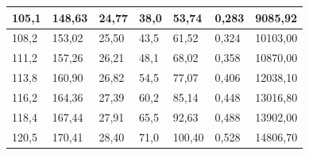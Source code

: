 \documentclass[a4paper,12pt]{article} %
\begin{document}
\begin{table}[h!]
\begin{tabular}{|l|l|l|l|l|l|l|}
		105,1                                     & 148,63                                                  & 24,77                                                 & 38,0                                     & 53,74                                                   & 0,283                        & 9085,92                                         \\ \hline
		108,2                                     & 153,02                                                  & 25,50                                                 & 43,5                                     & 61,52                                                   & 0,324                        & 10103,00                                        \\ \hline
		111,2                                     & 157,26                                                  & 26,21                                                 & 48,1                                     & 68,02                                                   & 0,358                        & 10870,00                                        \\ \hline
		113,8                                     & 160,90                                                  & 26,82                                                 & 54,5                                     & 77,07                                                   & 0,406                        & 12038,10                                        \\ \hline
		116,2                                     & 164,36                                                  & 27,39                                                 & 60,2                                     & 85,14                                                   & 0,448                        & 13016,80                                        \\ \hline
		118,4                                     & 167,44                                                  & 27,91                                                 & 65,5                                     & 92,63                                                   & 0,488                        & 13902,00                                        \\ \hline
		120,5                                     & 170,41                                                  & 28,40                                                 & 71,0                                     & 100,40                                                  & 0,528                        & 14806,70                                        \\ \hline

\end{tabular}
\end{table}
\end{document}
